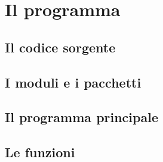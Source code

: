 \chapter*{Il programma}
\section*{Il codice sorgente}
\section*{I moduli e i pacchetti}
\section*{Il programma principale}
\section*{Le funzioni}